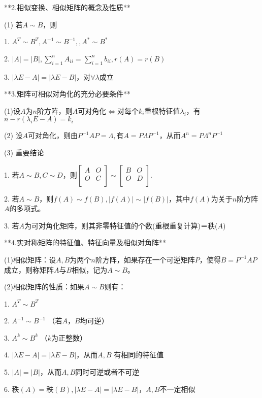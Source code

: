 **2.相似变换、相似矩阵的概念及性质**

(1) 若$A \sim B$，则

1. $A^{T} \sim B^{T},A^{- 1} \sim B^{- 1},,A^{*} \sim B^{*}$

2. $|A| = |B|,\sum_{i = 1}^{n}A_{{ii}} = \sum_{i =1}^{n}b_{{ii}},r(A) = r(B)$

3. $|\lambda E - A| = |\lambda E - B|$，对$\forall\lambda$成立

**3.矩阵可相似对角化的充分必要条件**

(1)设$A$为$n$阶方阵，则$A$可对角化$\Leftrightarrow$对每个$k_{i}$重根特征值$\lambda_{i}$，有$n-r(\lambda_{i}E - A) = k_{i}$

(2) 设$A$可对角化，则由$P^{- 1}{AP} = \Lambda,$有$A = {PΛ}P^{-1}$，从而$A^{n} = P\Lambda^{n}P^{- 1}$

(3) 重要结论

1. 若$A \sim B,C \sim D$，则$\begin{bmatrix}  A & O \\ O & C \\\end{bmatrix} \sim \begin{bmatrix} B & O \\  O & D \\\end{bmatrix}$.

2. 若$A \sim B$，则$f(A) \sim f(B),\left| f(A) \right| \sim \left| f(B)\right|$，其中$f(A)$为关于$n$阶方阵$A$的多项式。

3. 若$A$为可对角化矩阵，则其非零特征值的个数(重根重复计算)＝秩($A$)

**4.实对称矩阵的特征值、特征向量及相似对角阵**

(1)相似矩阵：设$A,B$为两个$n$阶方阵，如果存在一个可逆矩阵$P$，使得$B =P^{- 1}{AP}$成立，则称矩阵$A$与$B$相似，记为$A \sim B$。

(2)相似矩阵的性质：如果$A \sim B$则有：

1. $A^{T} \sim B^{T}$

2. $A^{- 1} \sim B^{- 1}$ （若$A$，$B$均可逆）

3. $A^{k} \sim B^{k}$ （$k$为正整数）

4. $\left| {λE} - A \right| = \left| {λE} - B \right|$，从而$A,B$
有相同的特征值

5. $\left| A \right| = \left| B \right|$，从而$A,B$同时可逆或者不可逆

6. 秩$\left( A \right) =$秩$\left( B \right),\left| {λE} - A \right| =\left| {λE} - B \right|$，$A,B$不一定相似

